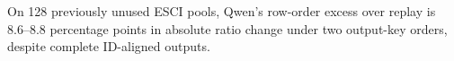 On 128 previously unused ESCI pools, Qwen's row-order excess over replay is 8.6--8.8 percentage points in absolute ratio change under two output-key orders, despite complete ID-aligned outputs.
